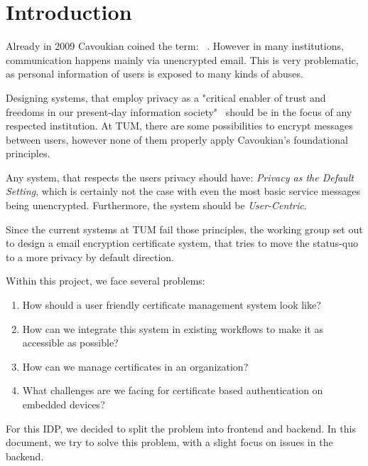 \chapter{Introduction}\label{ch:introduction}
Already in 2009 Cavoukian coined the term: ~\cite{cavoukian2009privacy}.
However in many institutions, communication happens mainly via unencrypted email.
This is very problematic, as personal information of users is exposed to many kinds of abuses.

Designing systems, that employ privacy as a "critical enabler of trust and freedoms in our present-day information
society"~\cite{cavoukian2009privacy} should be in the focus of any respected institution.
At TUM, there are some possibilities to encrypt messages between users, however none of them properly apply Cavoukian's
foundational principles.

Any system, that respects the users privacy should have:
\emph{Privacy as the Default Setting}, which is certainly not the case with even the most basic service messages being
unencrypted.
Furthermore, the system should be \emph{User-Centric}.

Since the current systems at TUM fail those principles, the working group  set out to design a email
encryption certificate system, that tries to move the status-quo to a more privacy by default direction.

Within this project, we face several problems:
\begin{enumerate}
    \item How should a user friendly certificate management system look like?
    \item How can we integrate this system in existing workflows to make it as accessible as possible?
    \item How can we manage certificates in an organization?
    \item What challenges are we facing for certificate based authentication on embedded devices?
\end{enumerate}

For this IDP, we decided to split the problem into frontend and backend.
In this document, we try to solve this problem, with a slight focus on issues in the backend.
